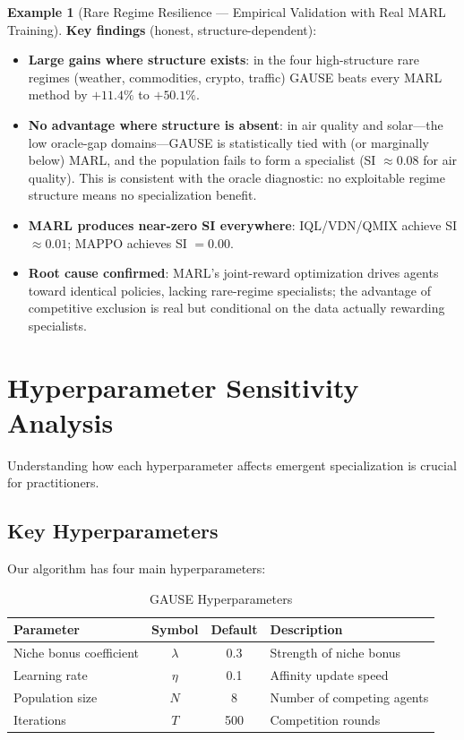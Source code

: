 \documentclass[11pt,a4paper]{article}
\theoremstyle{definition}
\newtheorem{example}{Example}[section]
\theoremstyle{plain}
\begin{document}
\begin{example}[Rare Regime Resilience --- Empirical Validation with Real MARL Training]
\textbf{Key findings} (honest, structure-dependent):
\begin{itemize}
    \item \textbf{Large gains where structure exists}: in the four high-structure
    rare regimes (weather, commodities, crypto, traffic) GAUSE beats
    every MARL method by $+11.4\%$ to $+50.1\%$.
    \item \textbf{No advantage where structure is absent}: in air quality and
    solar---the low oracle-gap domains---GAUSE is statistically tied
    with (or marginally below) MARL, and the population fails to form a
    specialist (SI $\approx 0.08$ for air quality). This is consistent with the
    oracle diagnostic: no exploitable regime structure means no specialization
    benefit.
    \item \textbf{MARL produces near-zero SI everywhere}: IQL/VDN/QMIX achieve
    SI $\approx 0.01$; MAPPO achieves SI $= 0.00$.
    \item \textbf{Root cause confirmed}: MARL's joint-reward optimization drives
    agents toward identical policies, lacking rare-regime specialists; the
    advantage of competitive exclusion is real but conditional on the data
    actually rewarding specialists.
\end{itemize}
\end{example}

\section{Hyperparameter Sensitivity Analysis}

Understanding how each hyperparameter affects emergent specialization is crucial for practitioners.

\subsection{Key Hyperparameters}

Our algorithm has four main hyperparameters:

\begin{table}[h]
\centering
\caption{GAUSE Hyperparameters}
\begin{tabular}{l|c|c|p{6cm}}
\toprule
Parameter & Symbol & Default & Description \\
\midrule
Niche bonus coefficient & $\lambda$ & 0.3 & Strength of niche bonus \\
Learning rate & $\eta$ & 0.1 & Affinity update speed \\
Population size & $N$ & 8 & Number of competing agents \\
Iterations & $T$ & 500 & Competition rounds \\
\bottomrule
\end{tabular}
\end{table}
\end{document}

